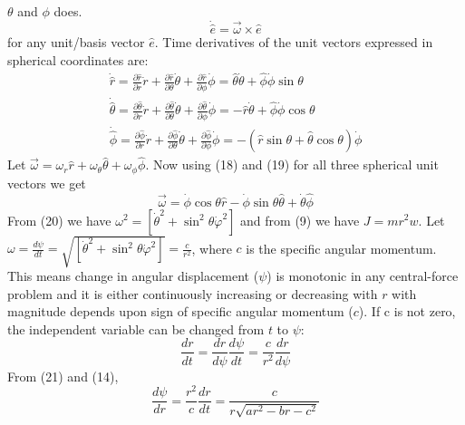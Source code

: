 \documentclass[conference]{IEEEtran}
\begin{document}
 $\theta$ and $\phi$ does. \begin{dmath}\dot{\hat{e}}=\vec{\omega} \times \hat{e}\end{dmath} for any unit/basis vector $\hat{e}$. Time derivatives of the unit vectors expressed in spherical coordinates are: \begin{equation}
\begin{array}{l}
\dot{\hat{r}}=\frac{\partial \hat{r}}{\partial r} \dot{r}+\frac{\partial \hat{r}}{\partial \theta} \dot{\theta}+\frac{\partial \hat{r}}{\partial \phi} \dot{\phi}=\hat{\theta} \dot{\theta}+\hat{\phi} \dot{\phi} \sin \theta \\
\dot{\hat{\theta}}=\frac{\partial \hat{\theta}}{\partial r} \dot{r}+\frac{\partial \hat{\theta}}{\partial \theta} \dot{\theta}+\frac{\partial \hat{\theta}}{\partial \phi} \dot{\phi}=-\hat{r} \dot{\theta}+\hat{\phi} \dot{\phi} \cos \theta \\
\dot{\hat{\phi}}=\frac{\partial \hat{\phi}}{\partial r} \dot{r}+\frac{\partial \hat{\phi}}{\partial \theta} \dot{\theta}+\frac{\partial \hat{\phi}}{\partial \phi} \dot{\phi}=-(\hat{r} \sin \theta+\hat{\theta} \cos \theta) \dot{\phi}
\end{array}
\end{equation}
 Let $\vec{\omega} = \omega_{r}\hat{r} + \omega_{\theta}\hat{\theta} + \omega_{\phi}\hat{\phi}$. Now using (18) and (19) for all three spherical unit vectors we get \begin{equation}
\vec{\omega} = \dot{\phi} \cos \theta \hat{r}-\dot{\phi} \sin \theta \hat{\theta} +\dot{\theta} \hat{\phi}
\end{equation}
From (20) we have $\omega^{2} = \left[\dot{\theta}^{2}+\sin ^{2} \theta \dot{\varphi}^{2}\right]$ and from (9) we have $J = mr^{2}w$. Let $\omega = \frac{d\psi}{dt} = \sqrt{\left[\dot{\theta}^{2}+\sin ^{2} \theta \dot{\varphi}^{2}\right]} = \frac{c}{r^{2}}$, where $c$ is the specific angular momentum. This means change in angular displacement ($\psi$) is monotonic in any central-force problem and it is either continuously increasing or decreasing with $r$ with magnitude depends upon sign of specific angular momentum ($c$). If c is not zero, the independent variable can be changed from $t$ to $\psi$: \begin{equation}
\frac{dr}{d t}=\frac{dr}{d \psi}\frac{d\psi}{d t} = \frac{c}{r^{2}}\frac{dr}{d \psi}
\end{equation} 
From (21) and (14), \begin{equation}
    \frac{d\psi}{d r} = \frac{r^{2}}{c}\frac{dr}{d t} = \frac{c}{r\sqrt{ar^{2} - br - c^{2}}}
\end{equation}
\end{document}
